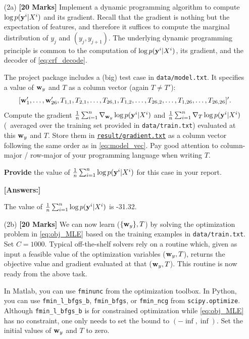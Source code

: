 \documentclass[11pt]{report}
\begin{document}
\begin{itemize}
	\item[(2a)] {\bf [20 Marks]} Implement a dynamic programming algorithm to compute $\log p(\mathbf{\boldsymbol{y}}^i | X^i)$ and its gradient.  Recall that the gradient is nothing but the expectation of features, and therefore it suffices to compute the marginal distribution of $y_j$ and $(y_j, y_{j+1})$. The underlying dynamic programming principle is common to the computation of $\log p(\mathbf{\boldsymbol{y}}^i | X^i)$, its gradient, and the decoder of \eqref{eq:crf_decode}.
	
	The project package includes a (big) test case in \verb#data/model.txt#.
	It specifies a value of $\mathbf{\boldsymbol{w}}_y$ and $T$ as a column vector (again $T \neq T'$):
	\begin{align}
		\label{eq:model_vec}
		[\mathbf{\boldsymbol{w}}'_1, \ldots, \mathbf{\boldsymbol{w}}'_{26}, T_{1,1}, T_{2,1}, \ldots, T_{26, 1}, T_{1,2}, \ldots, T_{26, 2}, \ldots, T_{1, 26}, \ldots, T_{26, 26}]'.
	\end{align}
	Compute the gradient $\frac{1}{n} \sum_{i=1}^n {\nabla}_{\mathbf{\boldsymbol{w}}_y} \log p(\mathbf{\boldsymbol{y}}^i | X^i)$ and
	$\frac{1}{n} \sum_{i=1}^n {\nabla}_{T} \log p(\mathbf{\boldsymbol{y}}^i | X^i)$
	(\ie\ averaged over the training set provided in \verb#data/train.txt#) evaluated at this $\mathbf{\boldsymbol{w}}_y$ and $T$.
	Store them in \underline{\texttt{result/gradient.txt}} as a column vector following the same order as in \eqref{eq:model_vec}.
	Pay good attention to column-major / row-major of your programming language when writing $T$.
	
	{\bf Provide} the value of $\frac{1}{n} \sum_{i=1}^n \log p(\mathbf{\boldsymbol{y}}^i | X^i)$ for this case in your report.
	
	{\bf [Answers:]} 

    The value of $\frac{1}{n} \sum_{i=1}^n \log p(\mathbf{\boldsymbol{y}}^i | X^i)$ is -31.32. 
	
	
	\item[(2b)] {\bf [20 Marks]} We can now learn ($\{\mathbf{\boldsymbol{w}}_y\}, T$) by solving the optimization problem in \eqref{eq:obj_MLE} based on the training examples in \verb#data/train.txt#.
	Set $C = 1000$.
	Typical off-the-shelf solvers rely on a routine which, given as input a feasible value of the optimization variables ($\mathbf{\boldsymbol{w}}_y, T$), returns the objective value and gradient evaluated at that ($\mathbf{\boldsymbol{w}}_y, T$). This routine is now ready from the above task.
	
	In Matlab, you can use \verb#fminunc# from the optimization toolbox. In Python, you can use \verb#fmin_l_bfgs_b#, \verb#fmin_bfgs#, or \verb#fmin_ncg# from \verb#scipy.optimize#.
	Although \verb#fmin_l_bfgs_b# is for constrained optimization while \eqref{eq:obj_MLE} has no constraint, one only needs to set the bound to $(-\inf, \inf)$.  Set the initial values of $\mathbf{\boldsymbol{w}}_y$ and $T$ to zero.
	

\end{itemize}
\end{document}
